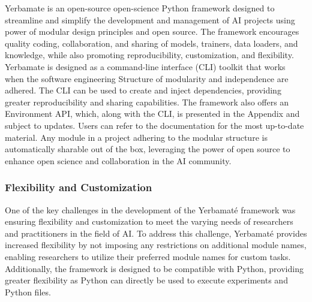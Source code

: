 

Yerbamate is an open-source open-science Python framework designed to streamline and simplify the development and management of AI projects using power of modular design principles and open source. The framework encourages quality coding, collaboration, and sharing of models, trainers, data loaders, and knowledge, while also promoting reproducibility, customization, and flexibility. 
Yerbamate is designed as a command-line interface (CLI) toolkit that works when the software engineering Structure of modularity and independence are adhered. The CLI can be used to create and inject dependencies, providing greater reproducibility and sharing capabilities. 
The framework also offers an Environment API, which, along with the CLI, is presented in the Appendix and subject to updates. Users can refer to the documentation for the most up-to-date material. Any module in a project adhering to the modular structure is automatically sharable out of the box, leveraging the power of open source to enhance open science and collaboration in the AI community.

\subsubsection{Flexibility and Customization}

One of the key challenges in the development of the Yerbamaté framework was ensuring flexibility and customization to meet the varying needs of researchers and practitioners in the field of AI. To address this challenge, Yerbamaté provides increased flexibility by not imposing any restrictions on additional module names, enabling researchers to utilize their preferred module names for custom tasks. 
Additionally, the framework is designed to be compatible with Python, providing greater flexibility as Python can directly be used to execute experiments and Python files.

